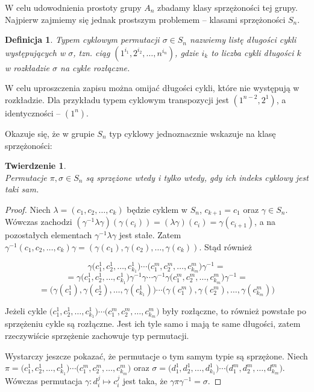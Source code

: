 \documentclass[licencjacka]{pracamgr}
\newtheorem{deff}{Definicja}[section]
\newtheorem{thh}{Twierdzenie}[section]
\begin{document}
W celu udowodnienia prostoty grupy $A_n$ zbadamy klasy
sprzężoności tej grupy. Najpierw zajmiemy się jednak prostszym
problemem -- klasami sprzężoności $S_n$.

\begin{deff}
    \emph{Typem cyklowym} permutacji $\sigma \in S_n$ nazwiemy listę długości cykli występujących w $\sigma$,
    tzn. ciąg $(1^{i_1}, 2^{i_2}, \ldots, n^{i_n})$,
    gdzie $i_k$ to liczba cykli długości $k$ w rozkładzie $\sigma$ na cykle rozłączne.
\end{deff}
W celu uproszczenia zapisu można omijać długości cykli, które nie
występują w rozkładzie. Dla przykładu typem cyklowym transpozycji
jest $(1^{n-2}, 2^1)$, a identyczności -- $(1^n)$.

Okazuje się, że w grupie $S_n$ typ cyklowy jednoznacznie wskazuje na
klasę sprzężoności:

\begin{thh} $ $ \\
    Permutacje $\pi, \sigma \in S_n$ są sprzężone wtedy i tylko wtedy, gdy ich indeks cyklowy jest taki sam.
\end{thh}
\begin{proof}
    Niech $\lambda = (c_1, c_2, \ldots, c_k)$ będzie cyklem w $S_n$, $c_{k+1} = c_1$ oraz $\gamma \in S_n$.
    Wówczas zachodzi 
    $(\gamma^{-1} \lambda \gamma)(\gamma(c_i)) = (\lambda \gamma)(c_i) = \gamma(c_{i+1})$,
    a na pozostałych elementach $\gamma^{-1} \lambda \gamma$ jest stałe.
    Zatem $\gamma^{-1} (c_1, c_2, \ldots, c_k) \gamma = (\gamma(c_1), \gamma(c_2), \ldots, \gamma(c_k))$.
    Stąd również

        $$\gamma \Big(c_1^1, c_2^1, \ldots, c_{k_1}^1\Big) \cdots \Big(c_1^m, c_2^m, \ldots, c_{k_m}^m \Big) \gamma^{-1} = $$
        $$ = \gamma \Big(c_1^1, c_2^1, \ldots, c_{k_1}^1\Big) \gamma^{-1} \gamma  \cdots \gamma ^{-1} \gamma \Big(c_1^m, c_2^m, \ldots, c_{k_m}^m\Big) \gamma^{-1} = $$
        $$ = \Big(\gamma (c_1^1), \gamma (c_2^1), \ldots, \gamma (c_{k_1}^1)\Big) \cdots \Big(\gamma (c_1^m), \gamma (c_2^m), \ldots, \gamma (c_{k_m}^m)\Big)$$

    Jeżeli cykle $\Big(c_1^1, c_2^1, \ldots, c_{k_1}^1\Big) \cdots \Big(c_1^m, c_2^m, \ldots, c_{k_m}^m \Big)$ były rozłączne,
    to również powstałe po sprzężeniu cykle są rozłączne.
    Jest ich tyle samo i mają te same długości, zatem rzeczywiście sprzężenie zachowuje typ permutacji.

    Wystarczy jeszcze pokazać, że permutacje o tym samym typie są sprzężone.
    Niech $\pi =    \Big(c_1^1, c_2^1, \ldots, c_{k_1}^1\Big) \cdots \Big(c_1^m, c_2^m, \ldots, c_{k_m}^m \Big)$
    oraz  $\sigma = \Big(d_1^1, d_2^1, \ldots, d_{k_1}^1\Big) \cdots \Big(d_1^m, d_2^m, \ldots, d_{k_m}^m \Big)$.
    Wówczas permutacja $\gamma \colon d_i^j \mapsto c_i^j$ jest taka, że $\gamma \pi \gamma^{-1} = \sigma$.
\end{proof}
\end{document}
